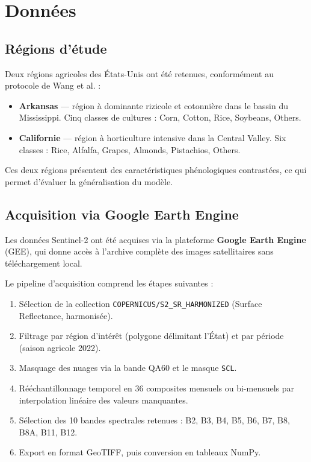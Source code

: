 
\chapter{Données}
\label{chap:donnees}

\section{Régions d'étude}

Deux régions agricoles des États-Unis ont été retenues, conformément au
protocole de Wang et al. \cite{wang2024} :

\begin{itemize}
  \item \textbf{Arkansas} — région à dominante rizicole et cotonnière dans le
        bassin du Mississippi. Cinq classes de cultures : Corn, Cotton, Rice,
        Soybeans, Others.
  \item \textbf{Californie} — région à horticulture intensive dans la Central
        Valley. Six classes : Rice, Alfalfa, Grapes, Almonds, Pistachios,
        Others.
\end{itemize}

Ces deux régions présentent des caractéristiques phénologiques contrastées,
ce qui permet d'évaluer la généralisation du modèle.

\section{Acquisition via Google Earth Engine}

Les données Sentinel-2 ont été acquises via la plateforme
\textbf{Google Earth Engine} (GEE), qui donne accès à l'archive complète des
images satellitaires sans téléchargement local.

Le pipeline d'acquisition comprend les étapes suivantes :
\begin{enumerate}
  \item Sélection de la collection \texttt{COPERNICUS/S2\_SR\_HARMONIZED}
        (Surface Reflectance, harmonisée).
  \item Filtrage par région d'intérêt (polygone délimitant l'État) et par
        période (saison agricole 2022).
  \item Masquage des nuages via la bande QA60 et le masque \texttt{SCL}.
  \item Rééchantillonnage temporel en 36 composites mensuels ou bi-mensuels
        par interpolation linéaire des valeurs manquantes.
  \item Sélection des 10 bandes spectrales retenues : B2, B3, B4, B5, B6,
        B7, B8, B8A, B11, B12.
  \item Export en format GeoTIFF, puis conversion en tableaux NumPy.
\end{enumerate}

